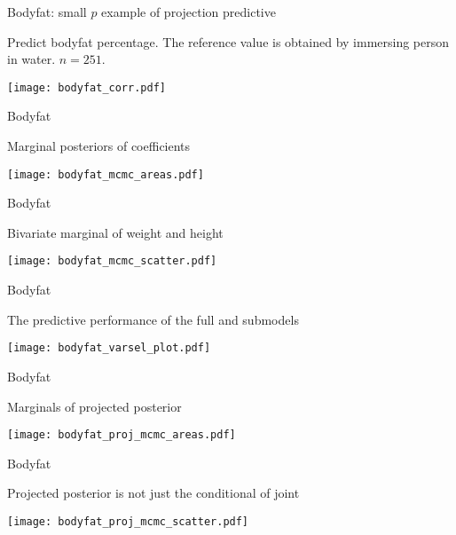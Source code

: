 \documentclass[english,t]{beamer}
\begin{document}
\begin{frame}
  
  {\Large\color{navyblue} Bodyfat: small $p$ example of projection predictive}
  
  Predict bodyfat percentage. The reference value is obtained by
  immersing person in water. $n=251$.

  \pause
  \vspace{-0.7\baselineskip}
  \texttt{[image: bodyfat\_corr.pdf]}

\end{frame}

\begin{frame}
  
  {\Large\color{navyblue} Bodyfat}

  Marginal posteriors of coefficients
  
  \texttt{[image: bodyfat\_mcmc\_areas.pdf]}

\end{frame}

\begin{frame}
  
  {\Large\color{navyblue} Bodyfat}

  Bivariate marginal of weight and height
  
  \texttt{[image: bodyfat\_mcmc\_scatter.pdf]}

\end{frame}

\begin{frame}
  
  {\Large\color{navyblue} Bodyfat}

  The predictive performance of the full and submodels
  
  \texttt{[image: bodyfat\_varsel\_plot.pdf]}

\end{frame}


\begin{frame}
  
  {\Large\color{navyblue} Bodyfat}

  Marginals of projected posterior
  
  \texttt{[image: bodyfat\_proj\_mcmc\_areas.pdf]}

\end{frame}

\begin{frame}
  
  {\Large\color{navyblue} Bodyfat}

  Projected posterior is not just the conditional of joint
  
  \texttt{[image: bodyfat\_proj\_mcmc\_scatter.pdf]}

\end{frame}
\end{document}
